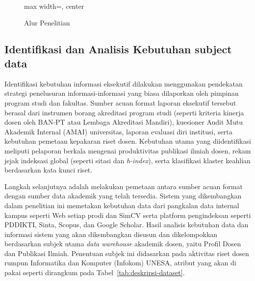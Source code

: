 \documentclass{rapidsart}
\theoremstyle{plain}
\theoremstyle{remark}
\theoremstyle{definition}
\begin{document}
\begin{sloppypar}
\begin{figure}[htbp]
\begin{adjustbox}{max width=\textwidth, center}
        \end{adjustbox}
        \caption{Alur Penelitian}
        \label{fig:alur-penelitian}
    \end{figure}

    \subsection{Identifikasi dan Analisis Kebutuhan subject data}
    Identifikasi kebutuhan informasi eksekutif dilakukan menggunakan pendekatan strategi penelusuran informasi-informasi yang biasa dilaporkan oleh pimpinan program studi dan fakultas. Sumber acuan format laporan eksekutif tersebut berasal dari instrumen borang akreditasi program studi (seperti kriteria kinerja dosen oleh BAN-PT atau Lembaga Akreditasi Mandiri), kuesioner Audit Mutu Akademik Internal (AMAI) universitas, laporan evaluasi diri institusi, serta kebutuhan pemetaan kepakaran riset dosen. Kebutuhan utama yang diidentifikasi meliputi pelaporan berkala mengenai produktivitas publikasi ilmiah dosen, rekam jejak indeksasi global (seperti sitasi dan \textit{h-index}), serta klasifikasi klaster keahlian berdasarkan kata kunci riset.

    Langkah selanjutnya adalah melakukan pemetaan antara sumber acuan format dengan sumber data akademik yang telah tersedia. Sistem yang dikembangkan dalam penelitian ini memetakan kebutuhan data dari pangkalan data internal kampus seperti Web setiap prodi dan SimCV serta platform pengindeksan seperti PDDIKTI, Sinta, Scopus, dan Google Scholar. Hasil analisis kebutuhan data dan informasi sistem yang akan dikembangkan disusun dan dikelompokkan berdasarkan subjek utama \textit{data warehouse} akademik dosen, yaitu Profil Dosen dan Publikasi Ilmiah. Penentuan subjek ini didasarkan pada aktivitas riset dosen rumpun Informatika dan Komputer (Infokom) UNESA, atribut yang akan di pakai seperti dirangkum pada Tabel~\ref{tab:deskripsi-dataset}.


\end{sloppypar}
\end{document}
